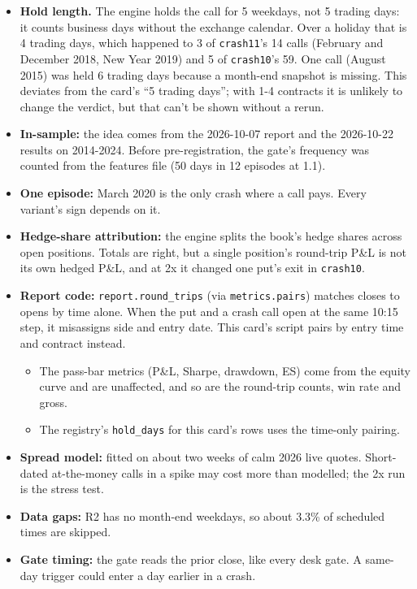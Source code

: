 \documentclass{article}
\begin{document}
\begin{itemize}

\item \textbf{Hold length.} The engine holds the call for 5 weekdays, not 5 trading days: it counts business days without the exchange calendar. Over a holiday that is 4 trading days, which happened to 3 of \texttt{crash11}'s 14 calls (February and December 2018, New Year 2019) and 5 of \texttt{crash10}'s 59. One call (August 2015) was held 6 trading days because a month-end snapshot is missing. This deviates from the card's ``5 trading days''; with 1-4 contracts it is unlikely to change the verdict, but that can't be shown without a rerun.

\item \textbf{In-sample:} the idea comes from the 2026-10-07 report and the 2026-10-22 results on 2014-2024. Before pre-registration, the gate's frequency was counted from the features file (50 days in 12 episodes at 1.1).

\item \textbf{One episode:} March 2020 is the only crash where a call pays. Every variant's sign depends on it.

\item \textbf{Hedge-share attribution:} the engine splits the book's hedge shares across open positions. Totals are right, but a single position's round-trip P\&L is not its own hedged P\&L, and at 2x it changed one put's exit in \texttt{crash10}.

\item \textbf{Report code:} \texttt{report.\allowbreak{}round\_\allowbreak{}trips} (via \texttt{metrics.\allowbreak{}pairs}) matches closes to opens by time alone. When the put and a crash call open at the same 10:15 step, it misassigns side and entry date. This card's script pairs by entry time and contract instead.

\begin{itemize}

\item The pass-bar metrics (P\&L, Sharpe, drawdown, ES) come from the equity curve and are unaffected, and so are the round-trip counts, win rate and gross.

\item The registry's \texttt{hold\_\allowbreak{}days} for this card's rows uses the time-only pairing.

\end{itemize}

\item \textbf{Spread model:} fitted on about two weeks of calm 2026 live quotes. Short-dated at-the-money calls in a spike may cost more than modelled; the 2x run is the stress test.

\item \textbf{Data gaps:} R2 has no month-end weekdays, so about 3.3\% of scheduled times are skipped.

\item \textbf{Gate timing:} the gate reads the prior close, like every desk gate. A same-day trigger could enter a day earlier in a crash.

\end{itemize}
\end{document}
